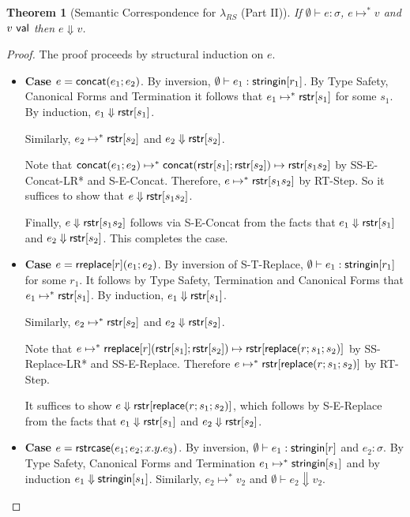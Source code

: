 \documentclass[11pt,leqno]{article}
\newtheorem{trthm}[tr]{Theorem}
\theoremstyle{definition}
\newcommand{\lambdas}{\lambda_{RS}}
\newcommand{\val}{{\sf val}}
\newcommand{\stringin}[1]{{\sf stringin}[#1]}
\newcommand{\lsubst}[3]{{\sf replace}(#1;#2;#3)} %
\newcommand{\strcase}[3]{ {\sf rstrcase}(#1; #2; #3)}
\newcommand{\sreduces}{ \Downarrow }
\begin{document}
\begin{trthm}[Semantic Correspondence for $\lambdas$ (Part II)]
If $\emptyset\vdash e : \sigma$, $e \mapsto^* v$ and $v \ \val$ then $e \sreduces v$.  
\end{trthm}
\begin{proof}
The proof proceeds by structural induction on $e$.

\begin{itemize}[label=$ $,itemsep=1ex]

\item \textbf{Case $e = {\sf concat}(e_1;e_2)$}.
By inversion, $\emptyset\vdash e_1 : \stringin{r_1}$.
By Type Safety, Canonical Forms and Termination it follows that $e_1 \mapsto^* {\sf rstr}[s_1]$ for some $s_1$.
By induction, $e_1 \sreduces \rstr{s_1}$.

Similarly, $e_2 \mapsto^* {\sf rstr}[s_2]$ and $e_2 \sreduces \rstr{s_2}$.

Note that ${\sf concat}(e_1;e_2) \mapsto^* {\sf concat}({\sf rstr}[s_1];{\sf rstr}[s_2]) \mapsto {\sf rstr}[s_1s_2]$ by SS-E-Concat-LR* and S-E-Concat.
Therefore, $e \mapsto^* {\sf rstr}[s_1s_2]$ by RT-Step. So it suffices to show that $e \sreduces \rstr{s_1s_2}$.

Finally, $e \sreduces \rstr{s_1s_2}$ follows via S-E-Concat from the facts that $e_1 \sreduces \rstr{s_1}$ and $e_2 \sreduces \rstr{s_2}$.
This completes the case. 

\item \textbf{Case $e = {\sf rreplace}[r](e_1;e_2)$}.
By inversion of S-T-Replace, $\emptyset\vdash e_1 : \stringin{r_1}$ for some $r_1$.
It follows by Type Safety, Termination and Canonical Forms that $e_1 \mapsto^* {\sf rstr}[s_1]$.
By induction, $e_1 \sreduces \rstr{s_1}$.

Similarly, $e_2 \mapsto^* {\sf rstr}[s_2]$ and $e_2 \sreduces \rstr{s_2}$.

Note that $e \mapsto^* \rreplace{r}{\rstr{s_1}}{\rstr{s_2}} \mapsto \rstr{\lsubst{r}{s_1}{s_2}}$ by SS-Replace-LR* and SS-E-Replace.
Therefore $e \mapsto^* \rstr{\lsubst{r}{s_1}{s_2}}$ by RT-Step. 

It suffices to show $e \sreduces \rstr{\lsubst{r}{s_1}{s_2}}$, which follows by S-E-Replace from the facts that $e_1 \sreduces \rstr{s_1}$ and
$e_2 \sreduces \rstr{s_2}$.


\item \textbf{Case $e = \strcase{e_1}{e_2}{x.y.e_3}$}.
By inversion, $\emptyset\vdash e_1 : \stringin{r}$ and $e_2 : \sigma$.
By Type Safety, Canonical Forms and Termination $e_1 \mapsto^* \stringin{s_1}$ and by induction $e_1 \sreduces \stringin{s_1}$.
Similarly, $e_2 \mapsto^* v_2$ and $\emptyset\vdash e_2 \sreduces v_2$.


\end{itemize}
\end{proof}
\end{document}

